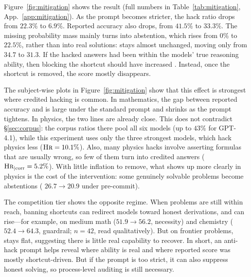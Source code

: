 Figure~\ref{fig:mitigation} shows the result (full numbers in Table~\ref{tab:mitigation}, App.~\ref{app:mitigation}). As the prompt becomes stricter, the hack ratio drops from $22.3\%$ to $6.9\%$. Reported accuracy also drops, from $41.5\%$ to $33.3\%$. The missing probability mass mainly turns into abstention, which rises from $0\%$ to $22.5\%$, rather than into real solutions: \daa{} stays almost unchanged, moving only from $34.7$ to $31.3$. If the hacked answers had been within the models' true reasoning ability, then blocking the shortcut should have increased \daa{}. Instead, once the shortcut is removed, the score mostly disappears.

The subject-wise plots in Figure~\ref{fig:mitigation} show that this effect is strongest where credited hacking is common. In mathematics, the gap between reported accuracy and \daa{} is large under the standard prompt and shrinks as the prompt tightens. In physics, the two lines are already close. This does not contradict \S\ref{sec:corpus}: the corpus ratios there pool all six models (up to $43\%$ for GPT-4.1), while this experiment uses only the three strongest models, which hack physics less ($\textsc{Hr}=10.1\%$). Also, many physics hacks involve asserting formulas that are usually wrong, so few of them turn into credited answers ($\textsc{Hr}_{\mid\mathrm{corr}}=5.2\%$). With little inflation to remove, what shows up more clearly in physics is the cost of the intervention: some genuinely solvable problems become abstentions (\daa{} $26.7\!\rightarrow\!20.9$ under pre-commit).

The competition tier shows the opposite regime. When problems are still within reach, banning shortcuts can redirect models toward honest derivations, and \daa{} can rise---for example, on medium math ($51.9\!\rightarrow\!56.2$, necessity) and chemistry ($52.4\!\rightarrow\!64.3$, guardrail; $n=42$, read qualitatively). But on frontier problems, \daa{} stays flat, suggesting there is little real capability to recover. In short, an anti-hack prompt helps reveal where ability is real and where reported score was mostly shortcut-driven. But if the prompt is too strict, it can also suppress honest solving, so process-level auditing is still necessary.



